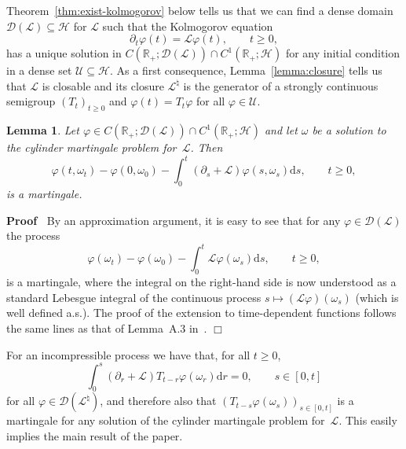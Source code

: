 \documentclass[10pt]{article}
\newcommand{\mathd}{\mathrm{d}}
\newenvironment{proof}{\noindent\textbf{Proof\ }}{\hspace*{\fill}$\Box$\medskip}
\newtheorem{lemma}{Lemma}
\begin{document}
Theorem~\ref{thm:exist-kolmogorov} below tells us that we can find a dense
domain $\mathcal{D} (\mathcal{L}) \subseteq \mathcal{H}$ for $\mathcal{L}$
such that the Kolmogorov equation
\begin{equation}
  \partial_t \varphi (t) =\mathcal{L} \varphi (t), \qquad t \geqslant 0,
  \label{eq:kolm}
\end{equation}
has a unique solution in $C (\mathbb{R}_+ ; \mathcal{D} (\mathcal{L})) \cap
C^1 (\mathbb{R}_+ ; \mathcal{H})$ for any initial condition in a dense set
$\mathcal{U} \subseteq \mathcal{H}$. As a first consequence,
Lemma~\ref{lemma:closure} tells us that $\mathcal{L}$ is closable and its
closure $\mathcal{L}^{\natural}$ is the generator of a strongly continuous
semigroup $(T_t)_{t \geqslant 0}$ and $\varphi (t) = T_t \varphi$ for all
$\varphi \in \mathcal{U}$.

\begin{lemma}
  \label{lem:ismart}Let $\varphi \in C (\mathbb{R}_+ ; \mathcal{D}
  (\mathcal{L})) \cap C^1 (\mathbb{R}_+ ; \mathcal{H})$ and let $\omega$ be a
  solution to the cylinder martingale problem for~$\mathcal{L}$. Then
  \[ \varphi (t, \omega_t) - \varphi (0, \omega_0) - \int_0^t (\partial_s
     +\mathcal{L}) \varphi (s, \omega_s) \mathd s, \qquad t \geqslant 0, \]
  is a martingale.
\end{lemma}

\begin{proof}
  By an approximation argument, it is easy to see that for any $\varphi \in
  \mathcal{D} (\mathcal{L})$ the process
  \[ \varphi (\omega_t) - \varphi (\omega_0) - \int_0^t \mathcal{L} \varphi
     (\omega_s) \mathd s, \qquad t \geqslant 0, \]
  is a martingale, where the integral on the right-hand side is now understood
  as a standard Lebesgue integral of the continuous process $s \mapsto
  (\mathcal{L} \varphi) (\omega_s)$ (which is well defined a.s.). The proof of
  the extension to time-dependent functions follows the same lines as that of
  Lemma~A.3 in~{\cite{gubinelli2018infinitesimal}}.
\end{proof}

For an incompressible process we have that, for all $t \geqslant 0$,
\[ \int_0^s (\partial_r +\mathcal{L}) T_{t - r} \varphi (\omega_r) \mathd r =
   0, \qquad s \in [0, t] \]
for all $\varphi \in \mathcal{D} (\mathcal{L}^{\natural})$, and therefore also
that $(T_{t - s} \varphi (\omega_s))_{s \in [0, t]}$ is a martingale for any
solution of the cylinder martingale problem for~$\mathcal{L}$. This easily
implies the main result of the paper.
\end{document}
